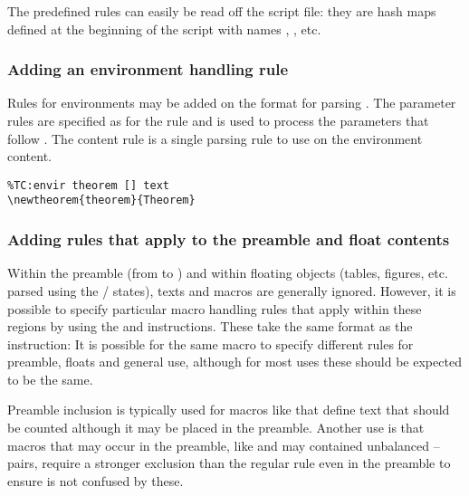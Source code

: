 \documentclass{article}
\begin{document}
The predefined rules can easily be read off the script file: they are hash maps defined at the beginning of the script with names , , etc.

\subsubsection{Adding an environment handling rule}

Rules for environments may be added on the format
for parsing . The parameter rules are specified as for the  rule and is used to process the parameters that follow . The content rule is a single parsing rule to use on the environment content.

\begin{lstlisting}
%TC:envir theorem [] text
\newtheorem{theorem}{Theorem}
\end{lstlisting}

\subsubsection{Adding rules that apply to the preamble and float contents}

Within the preamble (from  to ) and within floating objects (tables, figures, etc. parsed using the / states), texts and macros are generally ignored. However, it is possible to specify particular macro handling rules that apply within these regions by using the  and  \TeXcount{} instructions. These take the same format as the  instruction:
It is possible for the same macro to specify different rules for preamble, floats and general use, although for most uses these should be expected to be the same.

Preamble inclusion is typically used for macros like  that define text that should be counted although it may be placed in the preamble. Another use is that macros that may occur in the preamble, like  and may contained unbalanced -- pairs, require a stronger exclusion than the regular  rule even in the preamble to ensure \TeXcount{} is not confused by these.
\end{document}
